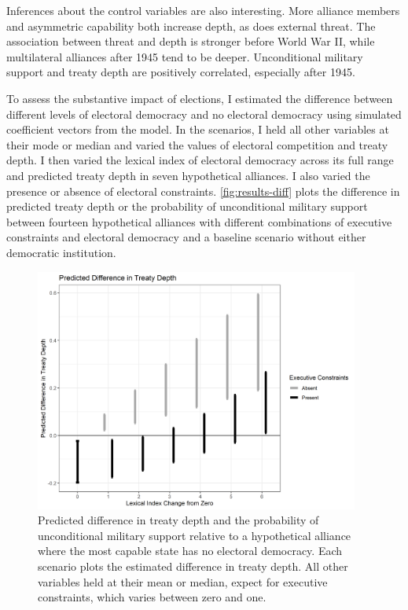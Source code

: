 \documentclass[12pt]{article}
\begin{document}
Inferences about the control variables are also interesting.
More alliance members and asymmetric capability both increase depth, as does external threat.
The association between threat and depth is stronger before World War II, while multilateral alliances after 1945 tend to be deeper. 
Unconditional military support and treaty depth are positively correlated, especially after 1945. 


To assess the substantive impact of elections, I estimated the difference between different levels of electoral democracy and no electoral democracy using simulated coefficient vectors from the model. 
In the scenarios, I held all other variables at their mode or median and varied the values of electoral competition and treaty depth. 
I then varied the lexical index of electoral democracy across its full range and predicted treaty depth in seven hypothetical alliances. 
I also varied the presence or absence of electoral constraints. 
\autoref{fig:results-diff} plots the difference in predicted treaty depth or the probability of unconditional military support between fourteen hypothetical alliances with different combinations of executive constraints and electoral democracy and a baseline scenario without either democratic institution. 


\begin{figure}[hbtp]
\centering
\includegraphics[width=0.95\textwidth]{../figures/results-diff.png}
\caption{Predicted difference in treaty depth and the probability of unconditional military support relative to a hypothetical alliance where the most capable state has no electoral democracy. Each scenario plots the estimated difference in treaty depth. All other variables held at their mean or median, expect for executive constraints, which varies between zero and one.}
\label{fig:results-diff}
\end{figure}
\end{document}
